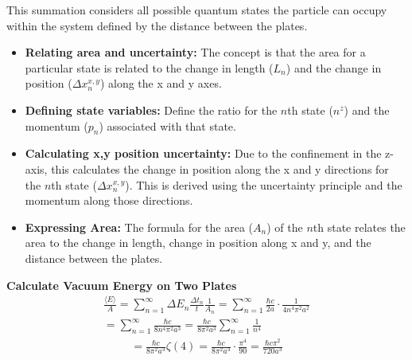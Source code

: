 This summation considers all possible quantum states the particle can occupy within the system 
defined by the distance between the plates.
\begin{itemize}
    \item \textbf{Relating area and uncertainty:} The concept is that the area for a particular state is related to 
    the change in length ($L_n$) and the change in position ($\Delta x_n^{x,y}$) along the x and y axes.
    \item \textbf{Defining state variables:} Define the ratio for the $n$th state ($n^z$) 
    and the momentum ($p_n$) associated with that state.
    \item \textbf{Calculating x,y position uncertainty:} Due to the confinement in the z-axis, 
    this calculates the change in position along the x and y directions for the $n$th state ($\Delta x_n^{x,y}$). 
    This is derived using the uncertainty principle and the momentum along those directions.
    \item \textbf{Expressing Area:} The formula for the area ($A_n$) of the $n$th state relates the area to the change in length, 
    change in position along x and y, and the distance between the plates.
    \end{itemize}
\noindent\textbf{Calculate Vacuum Energy on Two Plates}
\begin{align*}
    &\frac{\langle E \rangle}{A} = \sum_{n=1}^{\infty}\Delta E_n\frac{\Delta t_n}{t}\frac{1}{A_n} = \sum_{n=1}^{\infty} \frac{\hbar c }{2 a} \cdot \frac{1}{4 n^4 \pi^2 a^2} &\\
    &= \sum_{n=1}^{\infty} \frac{\hbar c}{8 n^4 \pi^2 a^3} = \frac{\hbar c}{8 \pi^2 a^3} \sum_{n=1}^{\infty} \frac{1}{n^4}&
\end{align*}
\begin{align}
    &= \frac{\hbar c}{8 \pi^2 a^3} \zeta(4) = \frac{\hbar c}{8 \pi^2 a^3} \cdot \frac{\pi^4}{90} = \frac{\hbar c \pi^2}{720 a^3}&
\end{align}
